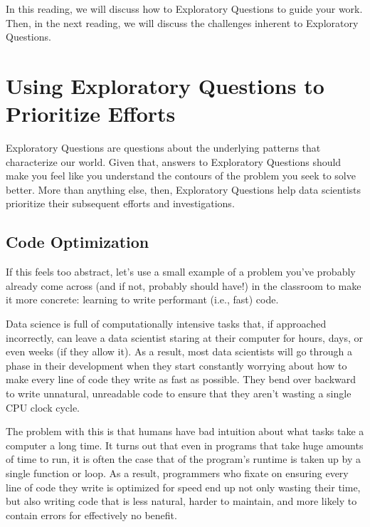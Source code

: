 \documentclass[letterpaper,10pt,english]{jupyterBook}
\begin{document}
\sphinxAtStartPar
In this reading, we will discuss how to  Exploratory Questions to guide your work. Then, in the next reading, we will discuss the challenges inherent to  Exploratory Questions.


\section{Using Exploratory Questions to Prioritize Efforts}
\label{\detokenize{30_questions/10_using_exploratory_questions:using-exploratory-questions-to-prioritize-efforts}}
\sphinxAtStartPar
Exploratory Questions are questions about the underlying patterns that characterize our world. Given that, answers to Exploratory Questions should make you feel like you understand the contours of the problem you seek to solve better. More than anything else, then, Exploratory Questions help data scientists prioritize their subsequent efforts and investigations.


\subsection{Code Optimization}
\label{\detokenize{30_questions/10_using_exploratory_questions:code-optimization}}
\sphinxAtStartPar
If this feels too abstract, let’s use a small example of a problem you’ve probably already come across (and if not, probably should have!) in the classroom to make it more concrete: learning to write performant (i.e., fast) code.

\sphinxAtStartPar
Data science is full of computationally intensive tasks that, if approached incorrectly, can leave a data scientist staring at their computer for hours, days, or even weeks (if they allow it). As a result, most data scientists will go through a phase in their development when they start constantly worrying about how to make every line of code they write as fast as possible. They bend over backward to write unnatural, unreadable code to ensure that they aren’t wasting a single CPU clock cycle.

\sphinxAtStartPar
The problem with this is that humans have  bad intuition about what tasks take a computer a long time. It turns out that even in programs that take huge amounts of time to run, it is often the case that  of the program’s runtime is taken up by a single function or loop. As a result, programmers who fixate on ensuring every line of code they write is optimized for speed end up not only wasting their  time, but also writing code that is less natural, harder to maintain, and more likely to contain errors for effectively no benefit.
\end{document}
